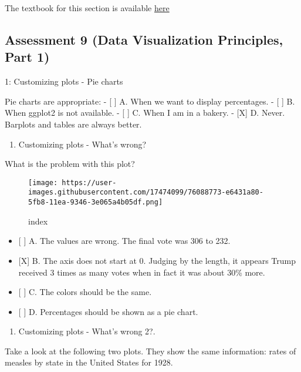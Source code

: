 \documentclass[]{article}
\providecommand{\tightlist}{%
  \setlength{\itemsep}{0pt}\setlength{\parskip}{0pt}}
\begin{document}
The textbook for this section is available
\href{https://rafalab.github.io/dsbook/data-visualization-principles.html}{here}

\hypertarget{assessment-9-data-visualization-principles-part-1}{%
\subsection{Assessment 9 (Data Visualization Principles, Part
1)}\label{assessment-9-data-visualization-principles-part-1}}

1: Customizing plots - Pie charts

Pie charts are appropriate: - {[} {]} A. When we want to display
percentages. - {[} {]} B. When ggplot2 is not available. - {[} {]} C.
When I am in a bakery. - {[}X{]} D. Never. Barplots and tables are
always better.

\begin{enumerate}
\def\labelenumi{\arabic{enumi}.}
\setcounter{enumi}{1}
\tightlist
\item
  Customizing plots - What's wrong?
\end{enumerate}

What is the problem with this plot?

\begin{figure}
\centering
\texttt{[image: https://user-images.githubusercontent.com/17474099/76088773-e6431a80-5fb8-11ea-9346-3e065a4b05df.png]}
\caption{index}
\end{figure}

\begin{itemize}
\tightlist
\item
  {[} {]} A. The values are wrong. The final vote was 306 to 232.
\item
  {[}X{]} B. The axis does not start at 0. Judging by the length, it
  appears Trump received 3 times as many votes when in fact it was about
  30\% more.
\item
  {[} {]} C. The colors should be the same.
\item
  {[} {]} D. Percentages should be shown as a pie chart.
\end{itemize}

\begin{enumerate}
\def\labelenumi{\arabic{enumi}.}
\setcounter{enumi}{2}
\tightlist
\item
  Customizing plots - What's wrong 2?.
\end{enumerate}

Take a look at the following two plots. They show the same information:
rates of measles by state in the United States for 1928.
\end{document}
